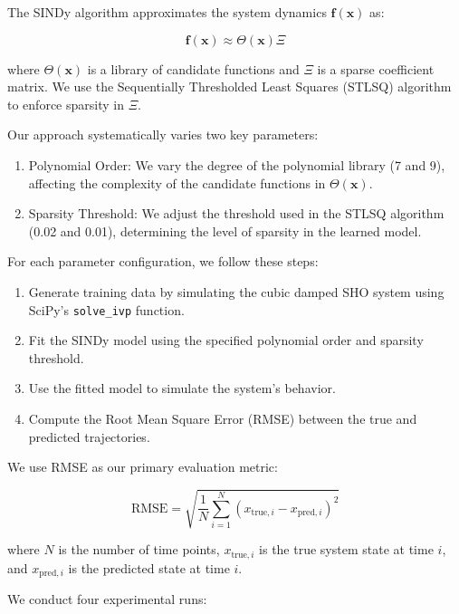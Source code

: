 \documentclass{article} %
\begin{document}
The SINDy algorithm approximates the system dynamics $\mathbf{f}(\mathbf{x})$ as:

\begin{equation}
    \mathbf{f}(\mathbf{x}) \approx \Theta(\mathbf{x})\Xi
\end{equation}

where $\Theta(\mathbf{x})$ is a library of candidate functions and $\Xi$ is a sparse coefficient matrix. We use the Sequentially Thresholded Least Squares (STLSQ) algorithm to enforce sparsity in $\Xi$.

Our approach systematically varies two key parameters:

\begin{enumerate}
    \item Polynomial Order: We vary the degree of the polynomial library (7 and 9), affecting the complexity of the candidate functions in $\Theta(\mathbf{x})$.
    \item Sparsity Threshold: We adjust the threshold used in the STLSQ algorithm (0.02 and 0.01), determining the level of sparsity in the learned model.
\end{enumerate}

For each parameter configuration, we follow these steps:

\begin{enumerate}
    \item Generate training data by simulating the cubic damped SHO system using SciPy's \texttt{solve\_ivp} function.
    \item Fit the SINDy model using the specified polynomial order and sparsity threshold.
    \item Use the fitted model to simulate the system's behavior.
    \item Compute the Root Mean Square Error (RMSE) between the true and predicted trajectories.
\end{enumerate}

We use RMSE as our primary evaluation metric:

\begin{equation}
    \text{RMSE} = \sqrt{\frac{1}{N}\sum_{i=1}^N (x_{\text{true},i} - x_{\text{pred},i})^2}
\end{equation}

where $N$ is the number of time points, $x_{\text{true},i}$ is the true system state at time $i$, and $x_{\text{pred},i}$ is the predicted state at time $i$.

We conduct four experimental runs:
\end{document}
